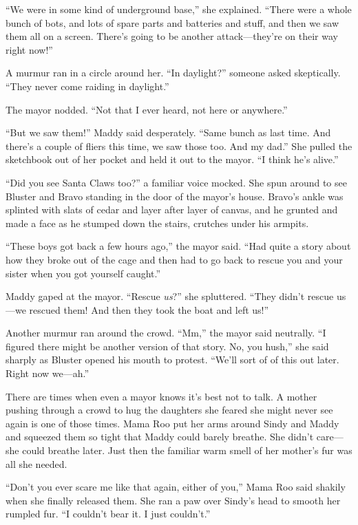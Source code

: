 \documentclass[10pt]{article}
\begin{document}
``We were in some kind of underground base,'' she explained. ``There
were a whole bunch of bots, and lots of spare parts and batteries and
stuff, and then we saw them all on a screen. There's going to be another
attack---they're on their way right now!''

A murmur ran in a circle around her. ``In daylight?'' someone asked
skeptically. ``They never come raiding in daylight.''

The mayor nodded. ``Not that I ever heard, not here or anywhere.''

``But we saw them!'' Maddy said desperately. ``Same bunch as last time.
And there's a couple of fliers this time, we saw those too. And my
dad.'' She pulled the sketchbook out of her pocket and held it out to
the mayor. ``I think he's alive.''

``Did you see Santa Claws too?'' a familiar voice mocked. She spun
around to see Bluster and Bravo standing in the door of the mayor's
house. Bravo's ankle was splinted with slats of cedar and layer after
layer of canvas, and he grunted and made a face as he stumped down the
stairs, crutches under his armpits.

``These boys got back a few hours ago,'' the mayor said. ``Had quite a
story about how they broke out of the cage and then had to go back to
rescue you and your sister when you got yourself caught.''

Maddy gaped at the mayor. ``Rescue \emph{us}?'' she spluttered. ``They
didn't rescue us---we rescued them! And then they took the boat and left
us!''

Another murmur ran around the crowd. ``Mm,'' the mayor said neutrally.
``I figured there might be another version of that story. No, you
hush,'' she said sharply as Bluster opened his mouth to protest. ``We'll
sort of of this out later. Right now we---ah.''

There are times when even a mayor knows it's best not to talk. A mother
pushing through a crowd to hug the daughters she feared she might never
see again is one of those times. Mama Roo put her arms around Sindy and
Maddy and squeezed them so tight that Maddy could barely breathe. She
didn't care---she could breathe later. Just then the familiar warm smell
of her mother's fur was all she needed.

``Don't you ever scare me like that again, either of you,'' Mama Roo
said shakily when she finally released them. She ran a paw over Sindy's
head to smooth her rumpled fur. ``I couldn't bear it. I just couldn't.''
\end{document}
